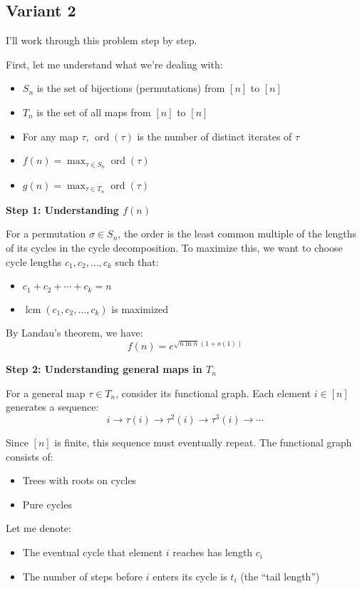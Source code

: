 \documentclass[12pt,a4paper]{article}
\theoremstyle{definition}
\begin{document}
\subsection{Variant 2}
    I'll work through this problem step by step.

    First, let me understand what we're dealing with:
    \begin{itemize}
        \item $S_n$ is the set of bijections (permutations) from $[n]$ to $[n]$
        \item $T_n$ is the set of all maps from $[n]$ to $[n]$
        \item For any map $\tau$, $\operatorname{ord}(\tau)$ is the number of distinct iterates of $\tau$
        \item $f(n) = \max_{\tau \in S_n} \operatorname{ord}(\tau)$
        \item $g(n) = \max_{\tau \in T_n} \operatorname{ord}(\tau)$
    \end{itemize}

    \textbf{Step 1: Understanding $f(n)$}

    For a permutation $\sigma \in S_n$, the order is the least common multiple of the lengths of its cycles in the cycle decomposition. To maximize this, we want to choose cycle lengths $c_1, c_2, \ldots, c_k$ such that:
    \begin{itemize}
        \item $c_1 + c_2 + \cdots + c_k = n$
        \item $\operatorname{lcm}(c_1, c_2, \ldots, c_k)$ is maximized
    \end{itemize}

    By Landau's theorem, we have:
    $$f(n) = e^{\sqrt{n \ln n}(1 + o(1))}$$

    \textbf{Step 2: Understanding general maps in $T_n$}

    For a general map $\tau \in T_n$, consider its functional graph. Each element $i \in [n]$ generates a sequence:
    $$i \to \tau(i) \to \tau^2(i) \to \tau^3(i) \to \cdots$$

    Since $[n]$ is finite, this sequence must eventually repeat. The functional graph consists of:
    \begin{itemize}
        \item Trees with roots on cycles
        \item Pure cycles
    \end{itemize}

    Let me denote:
    \begin{itemize}
        \item The eventual cycle that element $i$ reaches has length $c_i$
        \item The number of steps before $i$ enters its cycle is $t_i$ (the ``tail length'')
    \end{itemize}
\end{document}

